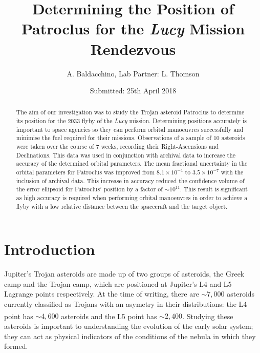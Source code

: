 \documentclass[10pt, twocolumn]{revtex4}    %
\begin{document}
                     

\title{Determining the Position of Patroclus for the \textit{Lucy} Mission Rendezvous} 
\date{Submitted: 25th April 2018}
\author{A. Baldacchino, Lab Partner: L. Thomson}

\begin{abstract}              

The aim of our investigation was to study the Trojan asteroid Patroclus to determine its position for the 2033 flyby of the \textit{Lucy} mission. Determining positions accurately is important to space agencies so they can perform orbital manoeuvres successfully and minimise the fuel required for their missions. Observations of a sample of 10 asteroids were taken over the course of 7 weeks, recording their Right-Ascensions and Declinations. This data was used in conjunction with archival data to increase the accuracy of the determined orbital parameters. The mean fractional uncertainty in the orbital parameters for Patroclus was improved from $8.1 \times 10^{-4}$ to $3.5 \times 10^{-7}$ with the inclusion of archival data. This increase in accuracy reduced the confidence volume of the error ellipsoid for Patroclus' position by a factor of ${\sim}10^{11}$. This result is significant as high accuracy is required when performing orbital manoeuvres in order to achieve a flyby with a low relative distance between the spacecraft and the target object. 

\end{abstract}

\maketitle
\thispagestyle{plain} %

\section{Introduction} 

Jupiter's Trojan asteroids are made up of two groups of asteroids, the Greek camp and the Trojan camp, which are positioned at Jupiter's L4 and L5 Lagrange points respectively. At the time of writing, there are ${\sim}7{,}000$ asteroids currently classified as Trojans with an asymetry in their distributions: the L4 point has ${\sim}4{,}600$ asteroids and the L5 point has ${\sim}2{,}400$.\textsuperscript{\cite{ListJupiterTrojans}} Studying these asteroids is important to understanding the evolution of the early solar system; they can act as physical indicators of the conditions of the nebula in which they formed.
\end{document}

